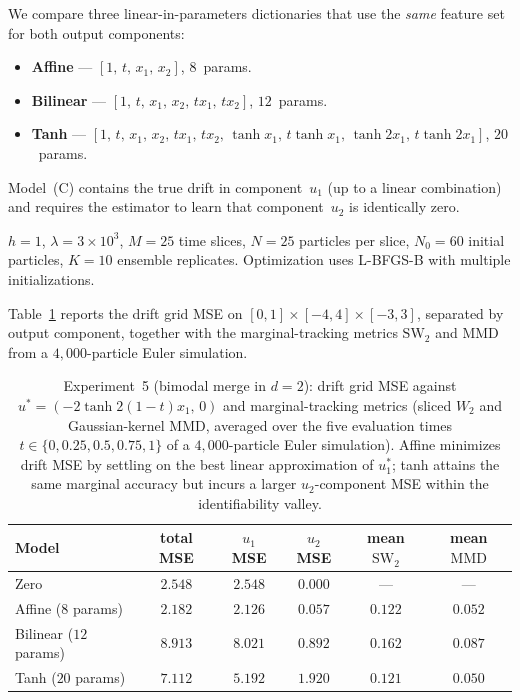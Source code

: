 \documentclass[11pt,leqno]{article}
\theoremstyle{plain}
\theoremstyle{remark}
\theoremstyle{definition}
\numberwithin{equation}{section}
\numberwithin{figure}{section}
\numberwithin{table}{section}
\begin{document}
We compare three linear-in-parameters dictionaries that use the
\emph{same} feature set for both output components:
\begin{itemize}
  \item[(A)] \textbf{Affine} --- $[1,\,t,\,x_1,\,x_2]$, $8$~params.
  \item[(B)] \textbf{Bilinear} --- $[1,\,t,\,x_1,\,x_2,\,tx_1,\,tx_2]$, $12$~params.
  \item[(C)] \textbf{Tanh} --- $[1,\,t,\,x_1,\,x_2,\,tx_1,\,tx_2,\,
             \tanh x_1,\,t\tanh x_1,\,\tanh 2x_1,\,t\tanh 2x_1]$, $20$~params.
\end{itemize}
Model~(C) contains the true drift in component~$u_1$ (up to a linear
combination) and requires the estimator to learn that component~$u_2$ is
identically zero.


$h=1$, $\lambda=3\times 10^{3}$, $M=25$ time slices, $N=25$ particles
per slice, $N_0=60$ initial particles, $K=10$ ensemble replicates.
Optimization uses L-BFGS-B with multiple initializations.


Table~\ref{tab:exp6-mse} reports the drift grid MSE on
$[0,1]\times[-4,4]\times[-3,3]$, separated by output component, together
with the marginal-tracking metrics $\mathrm{SW}_2$ and $\mathrm{MMD}$
from a $4{,}000$-particle Euler simulation.
\begin{table}[h]
\centering
\begin{tabular}{lccccc}
\toprule
 Model    & total MSE & $u_1$ MSE & $u_2$ MSE & mean $\mathrm{SW}_2$ & mean $\mathrm{MMD}$ \\
\midrule
 Zero                    & $2.548$ & $2.548$ & $0.000$ & --- & --- \\
 Affine   ($8$ params)   & $\mathbf{2.182}$ & $\mathbf{2.126}$ & $\mathbf{0.057}$ & $0.122$ & $0.052$ \\
 Bilinear ($12$ params)  & $8.913$ & $8.021$ & $0.892$ & $0.162$ & $0.087$ \\
 Tanh     ($20$ params)  & $7.112$ & $5.192$ & $1.920$ & $\mathbf{0.121}$ & $\mathbf{0.050}$ \\
\bottomrule
\end{tabular}
\caption{Experiment~5 (bimodal merge in $d=2$): drift grid MSE against
$u^{\!*}=(-2\tanh 2(1{-}t)x_1,\,0)$ and marginal-tracking metrics
(sliced $W_2$ and Gaussian-kernel MMD, averaged over the five
evaluation times $t\in\{0, 0.25, 0.5, 0.75, 1\}$ of a $4{,}000$-particle
Euler simulation).  Affine minimizes drift MSE by settling on the best
linear approximation of $u_1^{\!*}$; tanh attains the same marginal
accuracy but incurs a larger $u_2$-component MSE within the
identifiability valley.}
\label{tab:exp6-mse}
\end{table}
\end{document}
